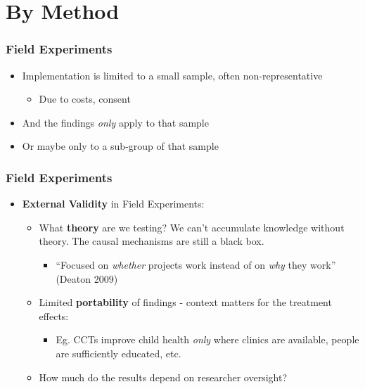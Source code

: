 \documentclass[xcolor=x11names,compress]{beamer}\usepackage[]{graphicx}\usepackage[]{xcolor}
\renewcommand{\(}{\begin{columns}}
\renewcommand{\)}{\end{columns}}
\newcommand{\<}[1]{\begin{column}{#1}}
\renewcommand{\>}{\end{column}}
\begin{document}
\section{By Method}

\begin{frame}
\frametitle{Field Experiments}
\begin{itemize}
\item Implementation is limited to a small sample, often non-representative
\pause
\begin{itemize}
\item Due to costs, consent
\pause
\end{itemize}
\item And the findings \textit{only} apply to that sample
\pause
\item Or maybe only to a sub-group of that sample
\end{itemize}
\end{frame}

\begin{frame}
\frametitle{Field Experiments}
\begin{itemize}
\item \textbf{External Validity} in Field Experiments:
\pause
\begin{itemize}
\item What \textbf{theory} are we testing? We can't accumulate knowledge without theory. The causal mechanisms are still a black box.
\pause
\begin{itemize}
\item ``Focused on \textit{whether} projects work instead of on \textit{why} they work'' (Deaton 2009)
\end{itemize}
\pause
\item Limited \textbf{portability} of findings - context matters for the treatment effects:
\pause
\begin{itemize}
\item Eg. CCTs improve child health \textit{only} where clinics are available, people are sufficiently educated, etc.
\end{itemize}
\pause
\item How much do the results depend on researcher oversight?
\end{itemize}
\end{itemize}
\end{frame}
\end{document}
